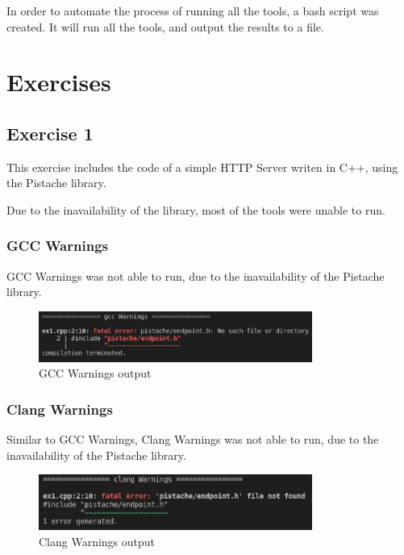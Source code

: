\documentclass{article}
\begin{document}
In order to automate the process of running all the tools, a bash script was created. It will run all the tools, and output the results to a file.

\section{Exercises}

\subsection{Exercise 1}

This exercise includes the code of a simple HTTP Server writen in C++, using the Pistache library.

Due to the inavailability of the library, most of the tools were unable to run.

\subsubsection{GCC Warnings}

GCC Warnings was not able to run, due to the inavailability of the Pistache library.

\begin{figure}[ht!]
    \centering
    \includegraphics[width=0.8\textwidth]{images/ex1/gccWarnings.png}
    \caption{GCC Warnings output}\label{fig:ex1/gccWarnings}
\end{figure}

\subsubsection{Clang Warnings}

Similar to GCC Warnings, Clang Warnings was not able to run, due to the inavailability of the Pistache library.

\begin{figure}[ht!]
    \centering
    \includegraphics[width=0.8\textwidth]{images/ex1/clangWarnings.png}
    \caption{Clang Warnings output}\label{fig:ex1/clangWarnings}
\end{figure}
\end{document}

